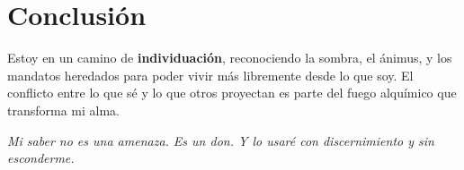 \documentclass[12pt,a4paper]{article}
\begin{document}
	\section*{Conclusión}
	
	Estoy en un camino de \textbf{individuación}, reconociendo la sombra, el ánimus, y los mandatos heredados para poder vivir más libremente desde lo que soy. El conflicto entre lo que sé y lo que otros proyectan es parte del fuego alquímico que transforma mi alma.
	
	\begin{center}
		\textit{Mi saber no es una amenaza. Es un don. Y lo usaré con discernimiento y sin esconderme.}
	\end{center}
	
\end{document}

